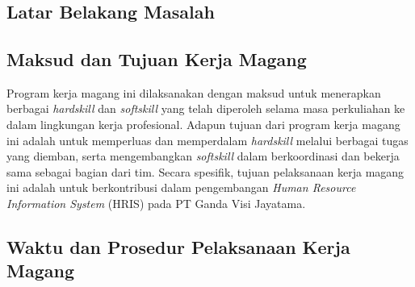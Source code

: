 \chapter{\babSatu}

\section{Latar Belakang Masalah}
\lipsum[1-2]



\section{Maksud dan Tujuan Kerja Magang}
Program kerja magang ini dilaksanakan dengan maksud untuk menerapkan berbagai 
\textit{hardskill} dan \textit{softskill} yang telah diperoleh selama masa 
perkuliahan ke dalam lingkungan kerja profesional. Adapun tujuan dari program 
kerja magang ini adalah untuk memperluas dan memperdalam \textit{hardskill} 
melalui berbagai tugas yang diemban, serta mengembangkan \textit{softskill} 
dalam berkoordinasi dan bekerja sama sebagai bagian dari tim. Secara spesifik, 
tujuan pelaksanaan kerja magang ini adalah untuk berkontribusi dalam 
pengembangan \textit{Human Resource Information System} (HRIS) pada 
PT Ganda Visi Jayatama.



\section{Waktu dan Prosedur Pelaksanaan Kerja Magang}

